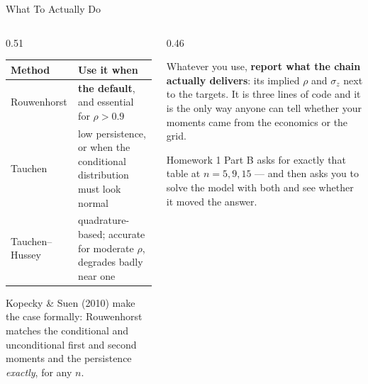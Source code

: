 \begin{frame}{What To Actually Do}
\begin{columns}[T]
\begin{column}{0.51\textwidth}
\renewcommand{\arraystretch}{1.15}
\begin{center}\footnotesize
\begin{tabularx}{\linewidth}{@{}>{\raggedright\arraybackslash}p{2.2cm} >{\raggedright\arraybackslash}X@{}}
\toprule
\textbf{Method} & \textbf{Use it when} \\
\midrule
Rouwenhorst & \textbf{the default}, and essential for $\rho>0.9$ \\
Tauchen & low persistence, or when the conditional distribution must look normal \\
Tauchen--Hussey & quadrature-based; accurate for moderate $\rho$, degrades badly near one \\
\bottomrule
\end{tabularx}
\end{center}
\medskip
\footnotesize
Kopecky \& Suen (2010) make the case formally: Rouwenhorst matches the conditional and unconditional first and second moments and the persistence \emph{exactly}, for any $n$.
\end{column}
\begin{column}{0.46\textwidth}
\begin{takeawaybox}[title=\textbf{The habit to build}]\small
Whatever you use, \textbf{report what the chain actually delivers}: its implied $\rho$ and $\sigma_z$ next to the targets. It is three lines of code and it is the only way anyone can tell whether your moments came from the economics or the grid.
\end{takeawaybox}
\medskip
\begin{examplebox}\footnotesize
Homework 1 Part B asks for exactly that table at $n=5,9,15$ --- and then asks you to solve the model with both and see whether it moved the answer.
\end{examplebox}
\end{column}
\end{columns}
\vspace{1mm}
\end{frame}

